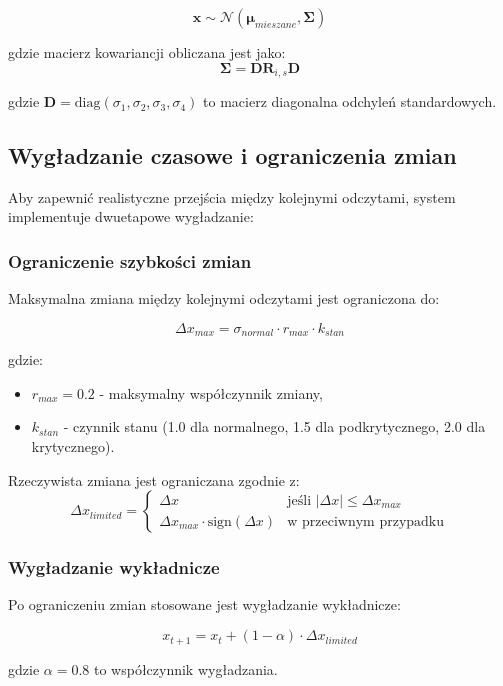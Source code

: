 $$\mathbf{x} \sim \mathcal{N}(\boldsymbol{\mu}_{mieszane}, \boldsymbol{\Sigma})$$

gdzie macierz kowariancji obliczana jest jako:
$$\boldsymbol{\Sigma} = \mathbf{D} \mathbf{R}_{i,s} \mathbf{D}$$

gdzie $\mathbf{D} = \text{diag}(\sigma_1, \sigma_2, \sigma_3, \sigma_4)$ to macierz diagonalna odchyleń standardowych.

\subsection{Wygładzanie czasowe i ograniczenia zmian}
\label{subsec:wygladzanie_czasowe}

Aby zapewnić realistyczne przejścia między kolejnymi odczytami, system implementuje dwuetapowe wygładzanie:

\subsubsection{Ograniczenie szybkości zmian}

Maksymalna zmiana między kolejnymi odczytami jest ograniczona do:

$$\Delta x_{max} = \sigma_{normal} \cdot r_{max} \cdot k_{stan}$$

gdzie:
\begin{itemize}
    \item $r_{max} = 0.2$ - maksymalny współczynnik zmiany,
    \item $k_{stan}$ - czynnik stanu (1.0 dla normalnego, 1.5 dla podkrytycznego, 2.0 dla krytycznego).
\end{itemize}

Rzeczywista zmiana jest ograniczana zgodnie z:
$$\Delta x_{limited} = \begin{cases}
\Delta x & \text{jeśli } |\Delta x| \leq \Delta x_{max} \\
\Delta x_{max} \cdot \text{sign}(\Delta x) & \text{w przeciwnym przypadku}
\end{cases}$$

\subsubsection{Wygładzanie wykładnicze}

Po ograniczeniu zmian stosowane jest wygładzanie wykładnicze:

$$x_{t+1} = x_t + (1-\alpha) \cdot \Delta x_{limited}$$

gdzie $\alpha = 0.8$ to współczynnik wygładzania.

